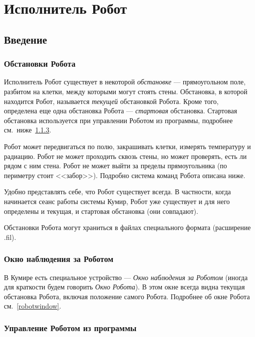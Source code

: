 \chapter{Исполнитель Робот}

\section{Введение}

\subsection{Обстановки Робота}
\label{robotfield}

Исполнитель Робот существует в некоторой \emph{обстановке} --- прямоугольном поле, разбитом на клетки, между которыми могут стоять стены. Обстановка, в которой находится Робот, называется \emph{текущей} обстановкой Робота. Кроме того, определена еще одна обстановка Робота --- \emph{стартовая} обстановка. Стартовая обстановка используется при управлении Роботом из программы, подробнее см.~ниже~\ref{robotmanage}.

Робот может передвигаться по полю, закрашивать клетки, измерять температуру и радиацию. Робот не может проходить сквозь стены, но может проверять, есть ли рядом с ним стена. Робот не может выйти за пределы прямоугольника (по периметру стоит <<забор>>). Подробно система команд Робота описана ниже.

Удобно представлять себе, что Робот существует всегда. В частности, когда начинается сеанс работы системы Кумир, Робот уже существует и для него определены и текущая, и стартовая обстановка (они совпадают).

Обстановки Робота могут храниться в файлах специального формата (расширение .fil).

\subsection{Окно наблюдения за Роботом}

В Кумире есть специальное устройство --- \emph{Окно наблюдения за Роботом} (иногда для краткости будем говорить \emph{Окно Робота}). В этом окне всегда видна текущая обстановка Робота, включая положение самого Робота. Подробнее об окне Робота см.~\ref{robotwindow}.

\subsection{Управление Роботом из программы}
\label{robotmanage}

